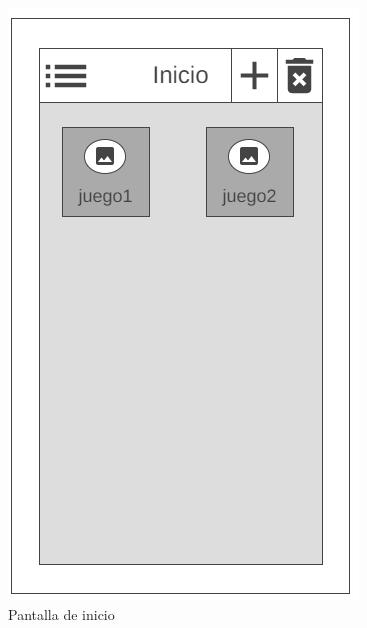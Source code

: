 \begin{figure}[H]
    \centering
    \begin{minipage}{0.38\textwidth}
        \centering
        \includegraphics[scale=0.5]{Figures/Mockups/Mock_Inicio.png}
        \caption{Pantalla de inicio}
        \label{PantallaInicio}    
    \end{minipage} \hspace{2cm}
    \begin{minipage}{0.38\textwidth}   
        \centering

\end{minipage}
\end{figure}
